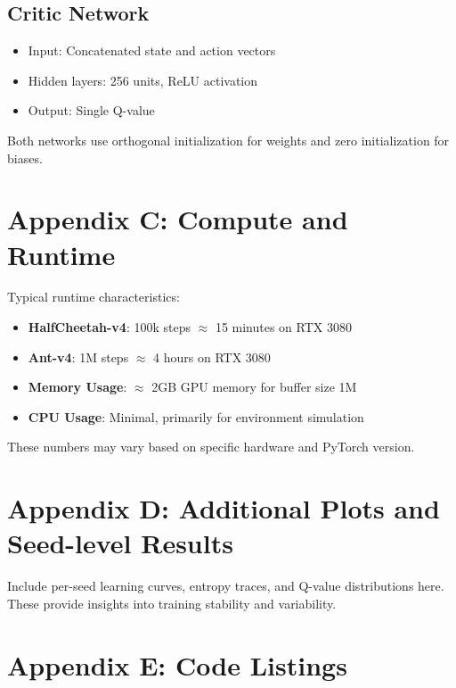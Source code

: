 \documentclass[conference]{IEEEtran}
\begin{document}
\subsection{Critic Network}
\begin{itemize}
  \item Input: Concatenated state and action vectors
  \item Hidden layers: 256 units, ReLU activation
  \item Output: Single Q-value
\end{itemize}

Both networks use orthogonal initialization for weights and zero initialization for biases.

\section{Appendix C: Compute and Runtime}
Typical runtime characteristics:
\begin{itemize}
  \item \textbf{HalfCheetah-v4}: 100k steps $\approx$ 15 minutes on RTX 3080
  \item \textbf{Ant-v4}: 1M steps $\approx$ 4 hours on RTX 3080
  \item \textbf{Memory Usage}: $\approx$ 2GB GPU memory for buffer size 1M
  \item \textbf{CPU Usage}: Minimal, primarily for environment simulation
\end{itemize}

These numbers may vary based on specific hardware and PyTorch version.

\section{Appendix D: Additional Plots and Seed-level Results}
Include per-seed learning curves, entropy traces, and Q-value distributions here. These provide insights into training stability and variability.

\section{Appendix E: Code Listings}
\end{document}
